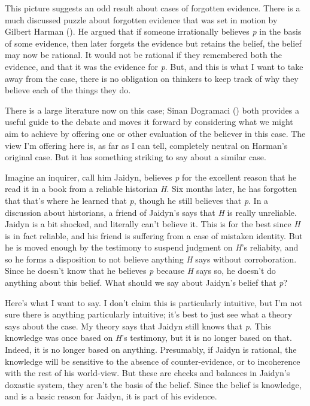\documentclass[
  10pt,
  letterpaper,
  twoside]{scrbook}
\begin{document}
This picture suggests an odd result about cases of forgotten evidence.
There is a much discussed puzzle about forgotten evidence that was set
in motion by Gilbert Harman (). He argued
that if someone irrationally believes \emph{p} in the basis of some
evidence, then later forgets the evidence but retains the belief, the
belief may now be rational. It would not be rational if they remembered
both the evidence, and that it was the evidence for \emph{p}. But, and
this is what I want to take away from the case, there is no obligation
on thinkers to keep track of why they believe each of the things they
do.

There is a large literature now on this case; Sinan Dogramaci
() both provides a useful guide to the
debate and moves it forward by considering what we might aim to achieve
by offering one or other evaluation of the believer in this case. The
view I'm offering here is, as far as I can tell, completely neutral on
Harman's original case. But it has something striking to say about a
similar case.

Imagine an inquirer, call him Jaidyn, believes \emph{p} for the
excellent reason that he read it in a book from a reliable historian
\emph{H}. Six months later, he has forgotten that that's where he
learned that \emph{p}, though he still believes that \emph{p}. In a
discussion about historians, a friend of Jaidyn's says that \emph{H} is
really unreliable. Jaidyn is a bit shocked, and literally can't believe
it. This is for the best since \emph{H} is in fact reliable, and his
friend is suffering from a case of mistaken identity. But he is moved
enough by the testimony to suspend judgment on \emph{H}'s reliabity, and
so he forms a disposition to not believe anything \emph{H} says without
corroboration. Since he doesn't know that he believes \emph{p} because
\emph{H} says so, he doesn't do anything about this belief. What should
we say about Jaidyn's belief that \emph{p}?

Here's what I want to say. I don't claim this is particularly intuitive,
but I'm not sure there is anything particularly intuitive; it's best to
just see what a theory says about the case. My theory says that Jaidyn
still knows that \emph{p}. This knowledge was once based on \emph{H}'s
testimony, but it is no longer based on that. Indeed, it is no longer
based on anything. Presumably, if Jaidyn is rational, the knowledge will
be sensitive to the absence of counter-evidence, or to incoherence with
the rest of his world-view. But these are checks and balances in
Jaidyn's doxastic system, they aren't the basis of the belief. Since the
belief is knowledge, and is a basic reason for Jaidyn, it is part of his
evidence.
\end{document}

